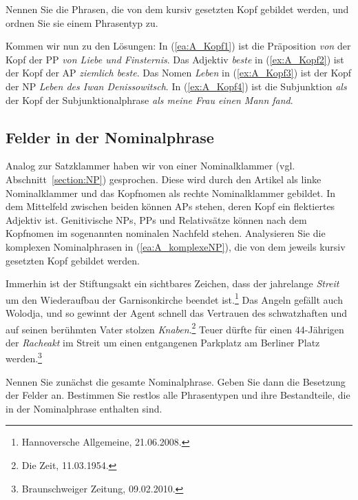 Nennen Sie die Phrasen, die von dem kursiv gesetzten Kopf gebildet werden, und ordnen Sie sie einem Phrasentyp zu.



Kommen wir nun zu den Lösungen: In (\ref{ea:A_Kopf1}) ist die Präposition \textit{von} der Kopf der PP \textit{von Liebe und Finsternis}. Das Adjektiv \textit{beste} in (\ref{ex:A_Kopf2}) ist der Kopf der AP \textit{ziemlich beste}. Das Nomen \textit{Leben} in (\ref{ex:A_Kopf3}) ist der Kopf der NP \textit{Leben des Iwan Denissowitsch}. In (\ref{ex:A_Kopf4}) ist die Subjunktion \textit{als} der Kopf der Subjunktionalphrase \textit{als meine Frau einen Mann fand}.


\subsection{Felder in der Nominalphrase}\label{subsection:A_Felder_NP}

Analog zur Satzklammer haben wir von einer Nominalklammer (vgl. Abschnitt~\ref{section:NP}) gesprochen. Diese wird durch den Artikel als linke Nominalklammer und das Kopfnomen als rechte Nominalklammer gebildet. In dem Mittelfeld zwischen beiden können APs stehen, deren Kopf ein flektiertes Adjektiv ist. Genitivische NPs, PPs und Relativsätze können nach dem Kopfnomen im sogenannten nominalen Nachfeld stehen. Analysieren Sie die komplexen Nominalphrasen in (\ref{ea:A_komplexeNP}), die von dem jeweils kursiv gesetzten Kopf gebildet werden. 

\ea \label{ea:A_komplexeNP}
\ea \label{ea:A_komplexeNP1} Immerhin ist der Stiftungsakt ein sichtbares Zeichen, dass der jahrelange \textit{Streit} um den Wiederaufbau der Garnisonkirche beendet ist.\footnote{Hannoversche Allgemeine, 21.06.2008.}
\ex \label{ex:A_komplexeNP2} Das Angeln gefällt auch Wolodja, und so gewinnt der Agent schnell das Vertrauen des schwatzhaften und auf seinen berühmten Vater stolzen \textit{Knaben}.\footnote{Die Zeit, 11.03.1954.}
\ex \label{ex:A_komplexeNP3} Teuer dürfte für einen 44-Jährigen der \textit{Racheakt} im Streit um einen entgangenen Parkplatz am Berliner Platz werden.\footnote{Braunschweiger Zeitung, 09.02.2010.}
\z 
\z 

Nennen Sie zunächst die gesamte Nominalphrase. Geben Sie dann die Besetzung der Felder an. Bestimmen Sie restlos alle Phrasentypen und ihre Bestandteile, die in der Nominalphrase enthalten sind.



